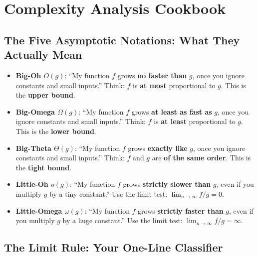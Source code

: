 \documentclass[12pt,portrait]{article}
\begin{document}
\newpage


\section{Complexity Analysis Cookbook}
\label{sec:complexity}

\subsection{The Five Asymptotic Notations: What They Actually Mean}

\begin{rulebox}
\begin{itemize}[leftmargin=*]
    \item \textbf{Big-Oh $O(g)$}: ``My function $f$ grows \textbf{no faster than} $g$, once you ignore constants and small inputs.'' Think: $f$ is \textbf{at most} proportional to $g$. This is the \textbf{upper bound}.
    \item \textbf{Big-Omega $\Omega(g)$}: ``My function $f$ grows \textbf{at least as fast as} $g$, once you ignore constants and small inputs.'' Think: $f$ is \textbf{at least} proportional to $g$. This is the \textbf{lower bound}.
    \item \textbf{Big-Theta $\Theta(g)$}: ``My function $f$ grows \textbf{exactly like} $g$, once you ignore constants and small inputs.'' Think: $f$ and $g$ are \textbf{of the same order}. This is the \textbf{tight bound}.
    \item \textbf{Little-Oh $o(g)$}: ``My function $f$ grows \textbf{strictly slower than} $g$, even if you multiply $g$ by a tiny constant.'' Use the limit test: $\lim_{n\to\infty} f/g = 0$.
    \item \textbf{Little-Omega $\omega(g)$}: ``My function $f$ grows \textbf{strictly faster than} $g$, even if you multiply $g$ by a huge constant.'' Use the limit test: $\lim_{n\to\infty} f/g = \infty$.
\end{itemize}
\end{rulebox}

\subsection{The Limit Rule: Your One-Line Classifier}
\end{document}
